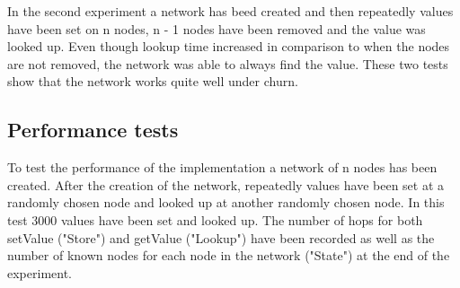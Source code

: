 \documentclass[a4paper, 12pt]{article} %
\begin{document}
In the second experiment a network has beed created and then repeatedly values have been set on n nodes, n - 1 nodes have been removed and the value was looked up. Even though lookup time increased in comparison to when the nodes are not removed, the network was able to always find the value. These two tests show that the network works quite well under churn.

\subsection{Performance tests}

To test the performance of the implementation a network of n nodes has been created. After the creation of the network, repeatedly values have been set at a randomly chosen node and looked up at another randomly chosen node. In this test 3000 values have been set and looked up. The number of hops for both setValue ("Store") and getValue ("Lookup") have been recorded as well as the number of known nodes for each node in the network ("State") at the end of the experiment.

\end{document}
